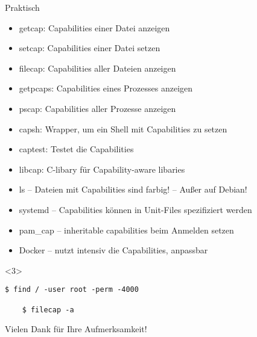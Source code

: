 \documentclass[usenames,dvipsnames,10pt]{beamer}
\begin{document}
\begin{frame}[fragile]{Praktisch}
	\begin{itemize}[<+->]
	\item getcap: Capabilities einer Datei anzeigen
	\item setcap: Capabilities einer Datei setzen
	\item filecap: Capabilities aller Dateien anzeigen
	\item getpcaps:  Capabilities eines Prozesses anzeigen
	\item pscap: Capabilities aller Prozesse anzeigen
	\item capsh: Wrapper, um ein Shell mit Capabilities zu setzen
	\item captest: Testet die Capabilities
	\item libcap: C-libary für Capability-aware libaries
	
	\item ls – Dateien mit Capabilities sind farbig! \pause – Außer auf Debian! \pause
	\item systemd – Capabilities können in Unit-Files spezifiziert werden
	\item pam\_cap – inheritable capabilities beim Anmelden setzen
	\item Docker – nutzt intensiv die Capabilities, anpassbar
	\end{itemize}
	
	\vfill
	\begin{visibleenv}
	\begin{lstlisting}[style=Bash]
	$ find / -user root -perm -4000
	
	$ filecap -a
	\end{lstlisting}
	\end{visibleenv}
\end{frame}

\begin{frame}
\begin{center}
	Vielen Dank für Ihre Aufmerksamkeit!
\end{center}
\end{frame}
\end{document}
